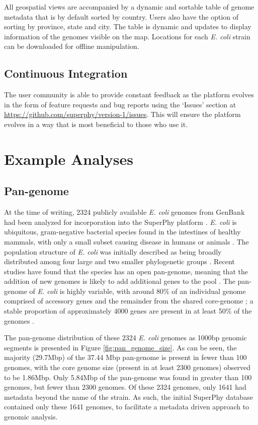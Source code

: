 \documentclass[doublespacing, linenumbers]{bmcart}
\begin{document}
All geospatial views are accompanied by a dynamic and sortable table of genome metadata that is by default sorted by country. Users also have the option of sorting by province, state and city. The table is dynamic and updates to display information of the genomes visible on the map. Locations for each \textit{E. coli} strain can be downloaded for offline manipulation.

\subsection{Continuous Integration}
The user community is able to provide constant feedback as the platform evolves in the form of feature requests and bug reports using the `Issues' section at \url{https://github.com/superphy/version-1/issues}.  This will ensure the platform evolves in a way that is most beneficial to those who use it.



\section{Example Analyses}
\subsection{Pan-genome}
At the time of writing, 2324 publicly available \textit{E. coli} genomes from GenBank had been analyzed for incorporation into the SuperPhy platform  \cite{benson_genbank_2012}. \textit{E. coli} is ubiquitous, gram-negative bacterial species found in the intestines of healthy mammals, with only a small subset causing disease in humans or animals \cite{tenaillon_population_2010}. The population structure of \textit{E. coli} was initially described as being broadly distributed among four large and two smaller phylogenetic groups \cite{selander_methods_1986,goullet_comparative_1989}. Recent studies have found that the species has an open pan-genome, meaning that the addition of new genomes is likely to add additional genes to the pool \cite{medini_microbial_2005}. The pan-genome of \textit{E. coli} is highly variable, with around 80\% of an individual genome comprised of accessory genes and the remainder from the shared core-genome \cite{lukjancenko_comparison_2010}; a stable proportion of approximately 4000 genes are present in at least 50\% of the genomes \cite{gordienko_evolution_2013}.

The pan-genome distribution of these 2324 \textit{E. coli} genomes as 1000bp genomic segments is presented in Figure \ref{fig:pan_genome_size}. As can be seen, the majority (29.7Mbp) of the 37.44 Mbp pan-genome is present in fewer than 100 genomes, with the core genome size (present in at least 2300 genomes) observed to be 1.86Mbp. Only 5.84Mbp of the pan-genome was found in greater than 100 genomes, but fewer than 2300 genomes. Of these 2324 genomes, only 1641 had metadata beyond the name of the strain. As such, the initial SuperPhy database contained only these 1641 genomes, to facilitate a metadata driven approach to genomic analysis.
\end{document}
